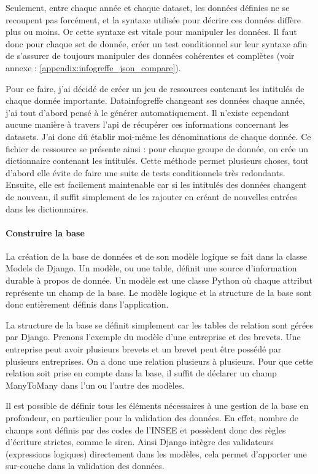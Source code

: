 \documentclass[french]{article}
\begin{document}
{Seulement, entre chaque année et chaque dataset, les données définies ne se recoupent pas forcément, et la syntaxe utilisée pour décrire ces données diffère plus ou moins. Or cette syntaxe est vitale pour manipuler les données. Il faut donc pour chaque set de donnée, créer un test conditionnel sur leur syntaxe afin de s'assurer de toujours manipuler des données cohérentes et complètes (voir annexe : \ref{appendix:infogreffe_json_compare}).

Pour ce faire, j'ai décidé de créer un jeu de ressources contenant les intitulés de chaque donnée importante. Datainfogreffe changeant ses données chaque année, j'ai tout d'abord pensé à le générer automatiquement. Il n'existe cependant aucune manière à travers l'api de récupérer ces informations concernant les datasets. J'ai donc dû établir moi-même les dénominations de chaque donnée. Ce fichier de ressource se présente ainsi : pour chaque groupe de donnée, on crée un dictionnaire contenant les intitulés.
\newline{}
Cette méthode permet plusieurs choses, tout d'abord elle évite de faire une suite de tests conditionnels très redondants. Ensuite, elle est facilement maintenable car si les intitulés des données changent de nouveau, il suffit simplement de les rajouter en créant de nouvelles entrées dans les dictionnaires.


\paragraph{Construire la base}

La création de la base de données et de son modèle logique se fait dans la classe Models de Django. Un modèle, ou une table, définit une source d'information durable à propos de donnée. Un modèle est une classe Python où chaque attribut représente un champ de la base. Le modèle logique et la structure de la base sont donc entièrement définis dans l'application.

La structure de la base se définit simplement car les tables de relation sont gérées par Django. Prenons l'exemple du modèle d'une entreprise et des brevets. Une entreprise peut avoir plusieurs brevets et un brevet peut être possédé par plusieurs entreprises. On a donc une relation plusieurs à plusieurs. Pour que cette relation soit prise en compte dans la base, il suffit de déclarer un champ ManyToMany dans l'un ou l'autre des modèles. 

Il est possible de définir tous les éléments nécessaires à une gestion de la base en profondeur, en particulier pour la validation des données. En effet, nombre de champs sont définis par des codes de l'INSEE et possèdent donc des règles d'écriture strictes, comme le \Gls{siren}. Ainsi Django intègre des validateurs (expressions logiques) directement dans les modèles, cela permet d'apporter une sur-couche dans la validation des données.

}
\end{document}
